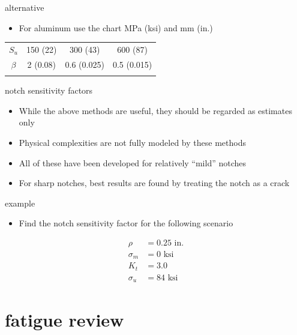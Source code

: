 \documentclass[
  letterpaper,
  ignorenonframetext,
  aspectratio=43,
  handout,
  12pt]{beamer}
\providecommand{\tightlist}{%
  \setlength{\itemsep}{0pt}\setlength{\parskip}{0pt}}
\providecommand{\tightlist}{%
\setlength{\itemsep}{0pt}\setlength{\parskip}{0pt}}
\begin{document}
\begin{frame}{alternative}
\protect\hypertarget{alternative-1}{}
\begin{itemize}
\tightlist
\item
  For aluminum use the chart MPa (ksi) and mm (in.)
\end{itemize}

\begin{longtable}[]{@{}cccc@{}}
\toprule
\endhead
\(S_u\) & 150 (22) & 300 (43) & 600 (87) \\ \addlinespace
\(\beta\) & 2 (0.08) & 0.6 (0.025) & 0.5 (0.015) \\ \addlinespace
\bottomrule
\end{longtable}
\end{frame}

\begin{frame}{notch sensitivity factors}
\protect\hypertarget{notch-sensitivity-factors}{}
\begin{itemize}
\tightlist
\item
  While the above methods are useful, they should be regarded as
  estimates only
\item
  Physical complexities are not fully modeled by these methods
\item
  All of these have been developed for relatively ``mild'' notches
\item
  For sharp notches, best results are found by treating the notch as a
  crack
\end{itemize}
\end{frame}

\begin{frame}{example}
\protect\hypertarget{example}{}
\begin{itemize}
\tightlist
\item
  Find the notch sensitivity factor for the following scenario
\end{itemize}

\[\begin{aligned}
  \rho &= 0.25 \text{ in.}\\
  \sigma_m &= 0 \text{ ksi}\\
  K_t &= 3.0\\
  \sigma_u &= 84 \text{ ksi}
\end{aligned}\]
\end{frame}

\hypertarget{fatigue-review}{%
\section{fatigue review}\label{fatigue-review}}
\end{document}
